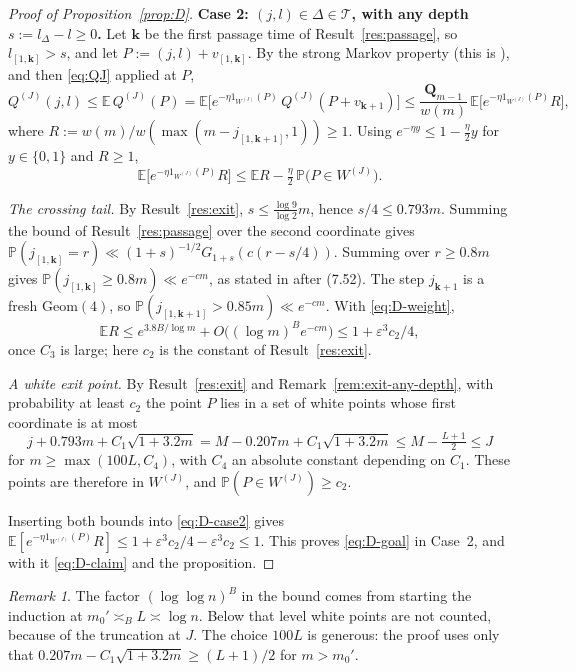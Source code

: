 \documentclass[11pt]{amsart}
\theoremstyle{remark}
\newtheorem{remark}{Remark}[section]
\newcommand{\E}{\mathbb{E}}
\renewcommand{\P}{\mathbb{P}}
\newcommand{\Geom}{\mathrm{Geom}}
\newcommand{\T}[1]{\cite[#1]{Tao22}}   %
\newcommand{\Tc}{\cite{Tao22}}         %
\theoremstyle{plain}
\begin{document}
\begin{proof}[Proof of Proposition~\ref{prop:D}]
\textbf{Case 2: $(j,l)\in\Delta\in\mathcal T$, with any depth $s:=l_\Delta-l\ge0$.} Let $\mathbf k$ be the first passage time of Result~\ref{res:passage}, so $l_{[1,\mathbf k]}>s$, and let $P:=(j,l)+v_{[1,\mathbf k]}$. By the strong Markov property (this is \T{(7.45)}), and then \eqref{eq:QJ} applied at $P$,
\[
Q^{(J)}(j,l)\le\E\,Q^{(J)}(P)=\E\Big[e^{-\eta1_{W^{(J)}}(P)}\,Q^{(J)}(P+v_{\mathbf k+1})\Big]\le\frac{\mathbf Q_{m-1}}{w(m)}\,\E\Big[e^{-\eta1_{W^{(J)}}(P)}R\Big],
\]
where $R:=w(m)/w(\max(m-j_{[1,\mathbf k+1]},1))\ge1$. Using $e^{-\eta y}\le1-\tfrac\eta2y$ for $y\in\{0,1\}$ and $R\ge1$,
\begin{equation}\label{eq:D-case2}
\E\big[e^{-\eta1_{W^{(J)}}(P)}R\big]\le\E R-\tfrac\eta2\,\P\big(P\in W^{(J)}\big).
\end{equation}

\emph{The crossing tail.} By Result~\ref{res:exit}, $s\le\frac{\log9}{\log2}m$, hence $s/4\le0.793m$. Summing the bound of Result~\ref{res:passage} over the second coordinate gives $\P(j_{[1,\mathbf k]}=r)\ll(1+s)^{-1/2}G_{1+s}(c(r-s/4))$. Summing over $r\ge0.8m$ gives $\P(j_{[1,\mathbf k]}\ge0.8m)\ll e^{-cm}$, as stated in \Tc{} after (7.52). The step $j_{\mathbf k+1}$ is a fresh $\Geom(4)$, so $\P(j_{[1,\mathbf k+1]}>0.85m)\ll e^{-cm}$. With \eqref{eq:D-weight},
\[
\E R\le e^{3.8B/\log m}+O\big((\log m)^Be^{-cm}\big)\le1+\varepsilon^3c_2/4,
\]
once $C_3$ is large; here $c_2$ is the constant of Result~\ref{res:exit}.

\emph{A white exit point.} By Result~\ref{res:exit} and Remark~\ref{rem:exit-any-depth}, with probability at least $c_2$ the point $P$ lies in a set of white points whose first coordinate is at most
\[
j+0.793m+C_1\sqrt{1+3.2m}=M-0.207m+C_1\sqrt{1+3.2m}\le M-\tfrac{L+1}2\le J
\]
for $m\ge\max(100L,C_4)$, with $C_4$ an absolute constant depending on $C_1$. These points are therefore in $W^{(J)}$, and $\P(P\in W^{(J)})\ge c_2$.

Inserting both bounds into \eqref{eq:D-case2} gives $\E[e^{-\eta1_{W^{(J)}}(P)}R]\le1+\varepsilon^3c_2/4-\varepsilon^3c_2\le1$. This proves \eqref{eq:D-goal} in Case~2, and with it \eqref{eq:D-claim} and the proposition.
\end{proof}

\begin{remark}\label{rem:D-loglog}
The factor $(\log\log n)^B$ in the bound comes from starting the induction at $m_0'\asymp_BL\asymp\log n$. Below that level white points are not counted, because of the truncation at $J$. The choice $100L$ is generous: the proof uses only that $0.207m-C_1\sqrt{1+3.2m}\ge(L+1)/2$ for $m>m_0'$.
\end{remark}
\end{document}
